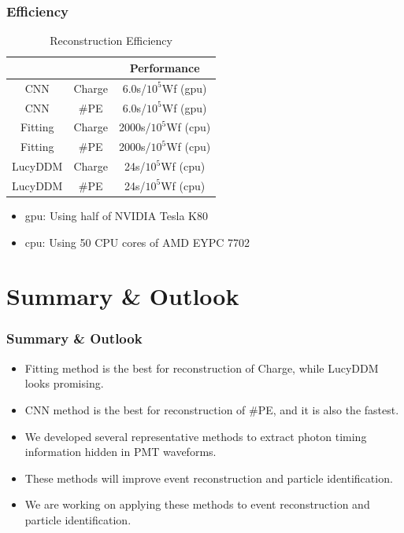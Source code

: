 \documentclass{beamer}
\begin{document}
\begin{frame}
\frametitle{Efficiency}
\begin{table}
    \centering
    \caption{Reconstruction Efficiency}
    \begin{tabular}{c|c|c}
        \hline
        &  & Performance \\
        \hline
        CNN & Charge & 6.0s/$10^{5}$Wf (gpu) \\
        \hline
        CNN & \#PE & 6.0s/$10^{5}$Wf (gpu)\\
        \hline
        Fitting & Charge & 2000s/$10^{5}$Wf (cpu) \\
        \hline
        Fitting & \#PE & 2000s/$10^{5}$Wf (cpu) \\
        \hline
        LucyDDM & Charge & 24s/$10^{5}$Wf (cpu) \\
        \hline
        LucyDDM & \#PE & 24s/$10^{5}$Wf (cpu) \\
        \hline
    \end{tabular}
\end{table}
\hspace{4mm}\begin{itemize}
    \item gpu: Using half of NVIDIA Tesla K80
    \item cpu: Using 50 CPU cores of AMD EYPC 7702
\end{itemize}
\end{frame}

\section{Summary \& Outlook}
\begin{frame}
\frametitle{Summary \& Outlook}
\begin{itemize}
    \item Fitting method is the best for reconstruction of Charge, while LucyDDM looks promising. 
    \item CNN method is the best for reconstruction of \#PE, and it is also the fastest. 
    \item We developed several representative methods to extract photon timing information hidden in PMT waveforms. 
    \item These methods will improve event reconstruction and particle identification. 
    \item We are working on applying these methods to event reconstruction and particle identification. 
\end{itemize}
\end{frame}
\end{document}
